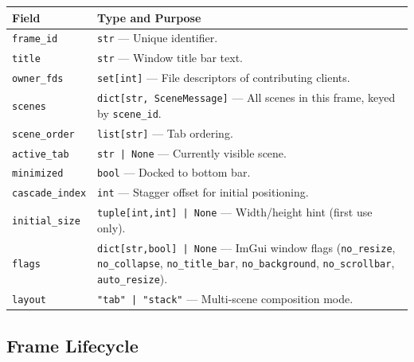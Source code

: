 \documentclass[a4paper,10pt]{article}
\newcommand{\field}[1]{\texttt{#1}}
\begin{document}
\begin{center}
\begin{tabular}{lp{8cm}}
\toprule
\textbf{Field} & \textbf{Type and Purpose} \\
\midrule
\field{frame\_id}       & \texttt{str} --- Unique identifier. \\
\field{title}           & \texttt{str} --- Window title bar text. \\
\field{owner\_fds}      & \texttt{set[int]} --- File descriptors of contributing
  clients. \\
\field{scenes}          & \texttt{dict[str, SceneMessage]} --- All scenes in
  this frame, keyed by \field{scene\_id}. \\
\field{scene\_order}    & \texttt{list[str]} --- Tab ordering. \\
\field{active\_tab}     & \texttt{str | None} --- Currently visible scene. \\
\field{minimized}       & \texttt{bool} --- Docked to bottom bar. \\
\field{cascade\_index}  & \texttt{int} --- Stagger offset for initial
  positioning. \\
\field{initial\_size}   & \texttt{tuple[int,int] | None} --- Width/height hint
  (first use only). \\
\field{flags}           & \texttt{dict[str,bool] | None} --- ImGui window flags
  (\texttt{no\_resize}, \texttt{no\_collapse}, \texttt{no\_title\_bar},
  \texttt{no\_background}, \texttt{no\_scrollbar}, \texttt{auto\_resize}). \\
\field{layout}          & \texttt{"tab" | "stack"} --- Multi-scene composition
  mode. \\
\bottomrule
\end{tabular}
\end{center}

\subsection{Frame Lifecycle}
\end{document}
